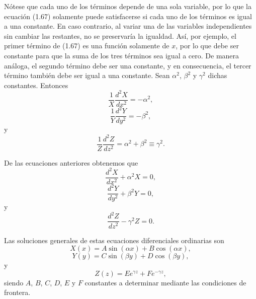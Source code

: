 \documentclass[12pt,a4paper]{book}
\begin{document}
Nótese que cada uno de los términos depende de una sola variable, por lo que la ecuación (1.67) solamente puede satisfacerse si cada uno de los términos es igual a una constante. En caso contrario, al variar una de las variables independientes sin cambiar las restantes, no se preservaría la igualdad. Así, por ejemplo, el primer término de (1.67) es una función solamente de $x$, por lo que debe ser constante para que la suma de los tres términos sea igual a cero. De manera análoga, el segundo término debe ser una constante, y en consecuencia, el tercer término también debe ser igual a una constante. Sean $\alpha^2$, $\beta^2$ y $\gamma^2$ dichas constantes. Entonces
\begin{equation}
\frac{1}{X}\frac{d^2X}{dx^2} = -\alpha^2,
\end{equation}
\begin{equation}
\frac{1}{Y}\frac{d^2Y}{dy^2} = -\beta^2,
\end{equation}
y
\begin{equation}
\frac{1}{Z}\frac{d^2Z}{dz^2} = \alpha^2 + \beta^2 \equiv \gamma^2.
\end{equation}

De las ecuaciones anteriores obtenemos que
\begin{equation}
\frac{d^2X}{dx^2} + \alpha^2X = 0,
\end{equation}
\begin{equation}
\frac{d^2Y}{dy^2} + \beta^2Y = 0,
\end{equation}
y
\begin{equation}
\frac{d^2Z}{dz^2} - \gamma^2Z = 0.
\end{equation}

Las soluciones generales de estas ecuaciones diferenciales ordinarias son
\begin{equation}
X(x) = A\sin(\alpha x) + B\cos(\alpha x),
\end{equation}
\begin{equation}
Y(y) = C\sin(\beta y) + D\cos(\beta y),
\end{equation}
y
\begin{equation}
Z(z) = Ee^{\gamma z} + Fe^{-\gamma z},
\end{equation}
siendo $A$, $B$, $C$, $D$, $E$ y $F$ constantes a determinar mediante las condiciones de frontera.
\end{document}
